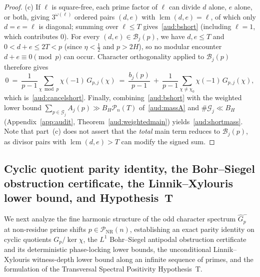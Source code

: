 \documentclass[11pt, a4paper]{article}
\theoremstyle{plain}
\theoremstyle{definition}
\DeclareMathOperator{\lcm}{lcm}
\begin{document}
\begin{proof}
(c) If $\ell$ is square-free, each prime factor of $\ell$ can divide $d$ alone, $e$ alone, or both, giving $3^{\omega(\ell)}$ ordered pairs $(d,e)$ with $\lcm(d,e)=\ell$, of which only $d=e=\ell$ is diagonal; summing over $\ell\le T$ gives~\eqref{aud:bshort} (including $\ell=1$, which contributes $0$). For every $(d,e)\in\mathcal{B}_j(p)$, we have $d,e\le T$ and $0<d+e\le 2T<p$ (since $\eta<\frac12$ and $p>2H$), so no modular encounter $d+e\equiv 0\pmod p$ can occur. Character orthogonality applied to $\mathcal{B}_j(p)$ therefore gives
\[
0\ =\ \frac{1}{p-1}\sum_{\chi\bmod p}\chi(-1)\,G_{p,j}(\chi)\ =\ \frac{b_j(p)}{p-1}\ +\ \frac{1}{p-1}\sum_{\chi\ne\chi_0}\chi(-1)\,G_{p,j}(\chi),
\]
which is~\eqref{aud:cancelshort}. Finally, combining~\eqref{aud:bshort} with the weighted lower bound $\sum_{p\in\mathcal{G}_j}A_j(p)\gg B_H\mathcal{P}_n(T)$ of~\eqref{aud:massA} and $\#\mathcal{G}_j\ll B_H$ (Appendix~\ref{app:audit}, Theorem~\ref{aud:weightedmain}) yields~\eqref{aud:shortmass}. Note that part~(c) does not assert that the \emph{total} main term reduces to $\mathcal{B}_j(p)$, as divisor pairs with $\lcm(d,e)>T$ can modify the signed sum.
\end{proof}

\subsection{Cyclic quotient parity identity, the Bohr--Siegel obstruction certificate, the Linnik--Xylouris lower bound, and Hypothesis~T}\label{subsec:bohr_siegel_and_linnik}

We next analyze the fine harmonic structure of the odd character spectrum $\widehat{G}_p^{-}$ at non-residue prime shifts $p\in\mathcal{P}_{\mathrm{NR}}(n)$, establishing an exact parity identity on cyclic quotients $G_p/\ker\chi$, the $L^{1}$ Bohr--Siegel antipodal obstruction certificate and its deterministic phase-locking lower bounds, the unconditional Linnik--Xylouris witness-depth lower bound along an infinite sequence of primes, and the formulation of the Transversal Spectral Positivity Hypothesis~T.
\end{document}
